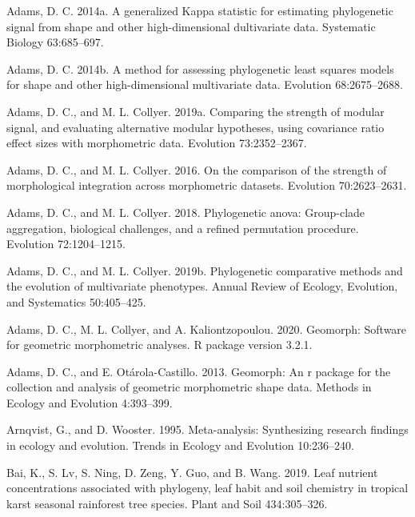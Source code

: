 \documentclass[]{article}
\begin{document}
\leavevmode\hypertarget{ref-Adams2014a}{}%
Adams, D. C. 2014a. A generalized Kappa statistic for estimating
phylogenetic signal from shape and other high-dimensional dultivariate
data. Systematic Biology 63:685--697.

\leavevmode\hypertarget{ref-Adams2014b}{}%
Adams, D. C. 2014b. A method for assessing phylogenetic least squares
models for shape and other high-dimensional multivariate data. Evolution
68:2675--2688.

\leavevmode\hypertarget{ref-AdamsCollyer2019b}{}%
Adams, D. C., and M. L. Collyer. 2019a. Comparing the strength of
modular signal, and evaluating alternative modular hypotheses, using
covariance ratio effect sizes with morphometric data. Evolution
73:2352--2367.

\leavevmode\hypertarget{ref-AdamsCollyer2016}{}%
Adams, D. C., and M. L. Collyer. 2016. On the comparison of the strength
of morphological integration across morphometric datasets. Evolution
70:2623--2631.

\leavevmode\hypertarget{ref-AdamsCollyer2018b}{}%
Adams, D. C., and M. L. Collyer. 2018. Phylogenetic anova: Group-clade
aggregation, biological challenges, and a refined permutation procedure.
Evolution 72:1204--1215.

\leavevmode\hypertarget{ref-AdamsCollyer2019}{}%
Adams, D. C., and M. L. Collyer. 2019b. Phylogenetic comparative methods
and the evolution of multivariate phenotypes. Annual Review of Ecology,
Evolution, and Systematics 50:405--425.

\leavevmode\hypertarget{ref-AdamsGeomorph}{}%
Adams, D. C., M. L. Collyer, and A. Kaliontzopoulou. 2020. Geomorph:
Software for geometric morphometric analyses. R package version 3.2.1.

\leavevmode\hypertarget{ref-AdamsOtarola2013}{}%
Adams, D. C., and E. Otárola-Castillo. 2013. Geomorph: An r package for
the collection and analysis of geometric morphometric shape data.
Methods in Ecology and Evolution 4:393--399.

\leavevmode\hypertarget{ref-Arnqvist1995}{}%
Arnqvist, G., and D. Wooster. 1995. Meta-analysis: Synthesizing research
findings in ecology and evolution. Trends in Ecology and Evolution
10:236--240.

\leavevmode\hypertarget{ref-Bai2019}{}%
Bai, K., S. Lv, S. Ning, D. Zeng, Y. Guo, and B. Wang. 2019. Leaf
nutrient concentrations associated with phylogeny, leaf habit and soil
chemistry in tropical karst seasonal rainforest tree species. Plant and
Soil 434:305--326.
\end{document}
